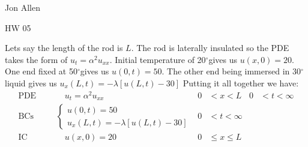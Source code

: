 \documentclass{article}
\newcommand{\degree}{\ensuremath{^\circ}}
\begin{document}
Jon Allen

HW 05

Lets say the length of the rod is $L$. The rod is laterally insulated so the PDE takes the form of $u_t=\alpha^2u_{xx}$. Initial temperature of 20\degree gives us $u(x,0)=20$. One end fixed at 50\degree gives us $u(0,t)=50$. The other end being immersed in 30\degree liquid gives us $u_x(L,t)=-\lambda[u(L,t)-30]$ Putting it all together we have:
\begin{align*}
  \text{PDE}& & &\quad u_t=\alpha^2u_{xx} & 0&<x<L & 0&<t<\infty\\
  \text{BCs}& & &
  \begin{cases} 
    u(0,t)=50\\
    u_x(L,t)=-\lambda[u(L,t)-30]
  \end{cases}& 0&<t<\infty\\
  \text{IC}& & &\quad u(x,0)=20 & 0&\leq x\leq L
\end{align*}
\end{document}
